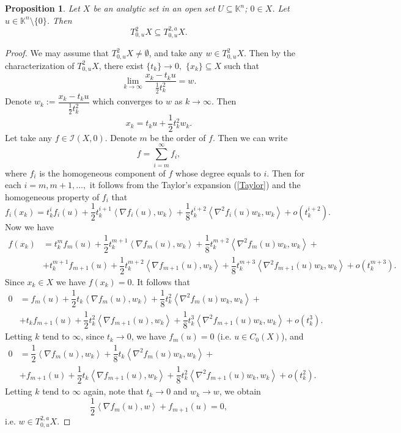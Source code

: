 \documentclass[10pt,reqno]{amsart}
\theoremstyle{break-italic}
\theoremstyle{break-italic}
\theoremstyle{break-italic}
\theoremstyle{break-italic}
\theoremstyle{break-italic}
\theoremstyle{break-italic}
\theoremstyle{break-italic}
\theoremstyle{break-italic}
\newtheorem{Proposition}[satz]{Proposition}
\theoremstyle{break-roman}
\theoremstyle{standard}
\theoremstyle{varthm-roman}
\theoremstyle{varthm-italic}
\theoremstyle{varthm-roman-break}
\theoremstyle{varthm-italic-break}
\theoremstyle{varthm-roman-no-punctuation}
\theoremstyle{varthm-italic-no-punctuation}
\numberwithin{equation}{section}
\def\dlim{\displaystyle\lim}
\def\dlim{\displaystyle\lim}
\newcommand{\seq}[1]{\left<#1\right>}
\begin{document}
\begin{Proposition} \label{inclusion} Let $X$ be an analytic set in an open set $U\subseteq \mathbb K^n$; $0\in X$. Let $u \in \mathbb K^n\setminus \{0\}$. Then 
\begin{equation}\label{equ-inclusion} T^2_{0,u} X \subseteq T^{2,a}_{0,u} X.
\end{equation}
\end{Proposition} 
\begin{proof} We may assume  that $ T^2_{0,u} X \not = \emptyset$, and take any $w \in  T^2_{0,u} X$. Then by the characterization of $T^2_{0,u} X $, there exist  $\{t_k\}\rightarrow 0,$ $  \{x_k\}\subseteq X$ such that $$\dlim_{k\rightarrow \infty } \dfrac{x_k-t_ku}{\frac{1}{2}t_k^2} = w. $$
Denote  $w_k:=\dfrac{x_k-t_ku}{\frac{1}{2}t_k^2}$ which converges to $w$ as $k\rightarrow \infty$. Then 
$$x_k = t_ku + \frac{1}{2}t_k^2w_k.$$ 
Let take any $f\in \mathcal{I}(X,0)$. Denote $m$ be the order of $f$. Then we can write 
$$ f = \sum_{i=m}^\infty f_i, $$
where $f_i$ is the homogeneous component of $f$ whose degree equals to $i$. Then for each $i=m, m+1,\ldots,$ it follows from the Taylor's expansion (\ref{Taylor}) and the homogeneous property of $f_i$  that  
$$f_i(x_k)=t_k^i f_i(u) + \dfrac{1}{2} t_k^{i+1} \seq{\nabla f_i(u),w_k} + \dfrac{1}{8}t_k^{i+2}\seq{\nabla^2 f_i(u)w_k, w_k} + o(t_k^{i+2}).$$
Now we have 
\begin{align}\label{Taylor-f}
f(x_k) & = t_k^m f_m(u) + \dfrac{1}{2} t_k^{m+1} \seq{\nabla f_m(u),w_k} + \dfrac{1}{8}t_k^{m+2}\seq{\nabla^2 f_m(u)w_k, w_k} + \\
& + t_k^{m+1} f_{m+1}(u) + \dfrac{1}{2} t_k^{m+2} \seq{\nabla f_{m+1}(u),w_k} + \dfrac{1}{8}t_k^{m+3}\seq{\nabla^2 f_{m+1}(u)w_k, w_k} + o(t_k^{m+3}).\nonumber
\end{align}
Since $x_k\in X$ we have $f(x_k)=0$. It follows that 
\begin{align*}
0 & =  f_m(u) + \dfrac{1}{2} t_k  \seq{\nabla f_m(u),w_k} + \dfrac{1}{8}t_k^{2}\seq{\nabla^2 f_m(u)w_k, w_k} + \\
& + t_k f_{m+1}(u) + \dfrac{1}{2} t_k^{2} \seq{\nabla f_{m+1}(u),w_k} + \dfrac{1}{8}t_k^{3}\seq{\nabla^2 f_{m+1}(u)w_k, w_k} + o(t_k^{3}).
\end{align*}
Letting $k $ tend to $\infty$, since $t_k \rightarrow 0$, we have $f_m(u)=0$ (i.e. $u\in C_0(X)$), and 
\begin{align*}
0 & =    \dfrac{1}{2} \seq{\nabla f_m(u),w_k} + \dfrac{1}{8}t_k \seq{\nabla^2 f_m(u)w_k, w_k} + \\
& +  f_{m+1}(u) + \dfrac{1}{2} t_k  \seq{\nabla f_{m+1}(u),w_k} + \dfrac{1}{8}t_k^{2}\seq{\nabla^2 f_{m+1}(u)w_k, w_k} + o(t_k^{2}).
\end{align*}
Letting $k$ tend to $\infty$ again, note that $t_k \rightarrow 0$ and $w_k \rightarrow w$, we obtain 
$$ \dfrac{1}{2} \seq{\nabla f_m(u),w}  + f_{m+1}(u) = 0,$$
i.e. $w \in T^{2,a}_{0,u} X$. 
\end{proof}
\end{document}
